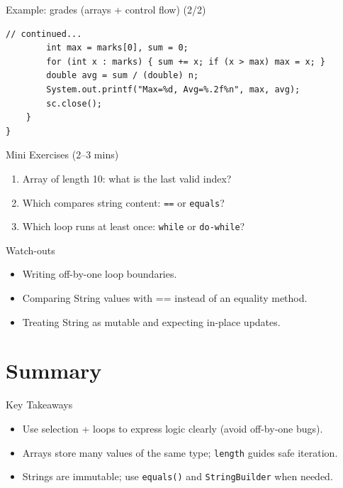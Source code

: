 \documentclass{beamer}
\begin{document}
\begin{frame}[fragile]{Example: grades (arrays + control flow) (2/2)}
\begin{lstlisting}
// continued...
        int max = marks[0], sum = 0;
        for (int x : marks) { sum += x; if (x > max) max = x; }
        double avg = sum / (double) n;
        System.out.printf("Max=%d, Avg=%.2f%n", max, avg);
        sc.close();
    }
}
\end{lstlisting}
  \slidesources{\OOPSUnitISources}
\end{frame}

\begin{frame}{Mini Exercises (2--3 mins)}
  \begin{enumerate}[<+->]
    \item Array of length 10: what is the last valid index?
    \item Which compares string content: \texttt{==} or \texttt{equals}?
    \item Which loop runs at least once: \texttt{while} or \texttt{do-while}?
  \end{enumerate}
  \slidesources{\OOPSUnitISources}
\end{frame}

\begin{frame}{Watch-outs}
\begin{itemize}[<+->]
  \item Writing off-by-one loop boundaries.
  \item Comparing String values with == instead of an equality method.
  \item Treating String as mutable and expecting in-place updates.
\end{itemize}
  \slidesources{\OOPSUnitISources}
\end{frame}

\section{Summary}
\label{sec:summary}

\begin{frame}{Key Takeaways}
  \begin{itemize}[<+->]
    \item Use selection + loops to express logic clearly (avoid off-by-one bugs).
    \item Arrays store many values of the same type; \texttt{length} guides safe iteration.
    \item Strings are immutable; use \texttt{equals()} and \texttt{StringBuilder} when needed.
  \end{itemize}
  \slidesources{\OOPSUnitISources}
\end{frame}
\end{document}
